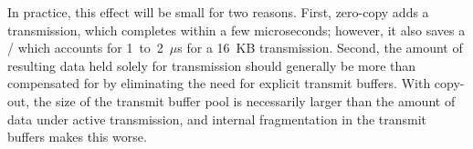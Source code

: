 In practice, this effect will be small for two reasons. First, zero-copy adds a
transmission, which completes within a few microseconds; however, it also saves a
\memcpy/  which accounts for 1~to~2~$\mu$s for a 16~KB transmission. Second, the
amount of resulting data held solely for transmission should generally be
more than compensated for by eliminating the need for explicit transmit
buffers. With copy-out, the size of the transmit buffer pool is necessarily
larger than the amount of data under active transmission, and internal
fragmentation in the transmit buffers makes this worse.
